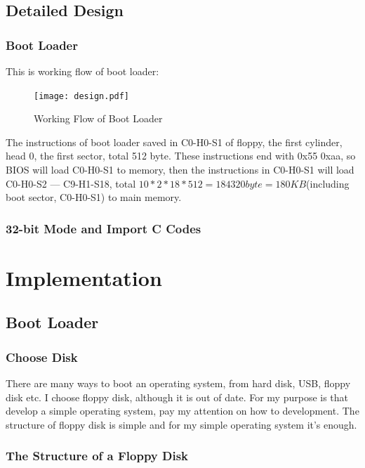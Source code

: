 \documentclass{swfcthesisp}
\begin{document}
\section{Detailed Design}
\label{sec:detailed-design}

\subsection{Boot Loader}
\label{sec:boot-loader}
This is working flow of boot loader:
\begin{figure}[!ht]
  \centering
  \texttt{[image: design.pdf]}
  \caption{Working Flow of Boot Loader}
  \label{fig:working-flow-boot-loader}
\end{figure}

The instructions of boot loader saved in C0-H0-S1 of floppy, the first cylinder, head 0,
the first sector, total 512 byte. These instructions end with 0x55 0xaa, so BIOS will load
C0-H0-S1 to memory, then the instructions in C0-H0-S1 will load C0-H0-S2 --- C9-H1-S18,
total $10*2*18*512=184320byte=180KB$(including boot sector, C0-H0-S1) to main memory.

\subsection{32-bit Mode and Import C Codes}
\label{sec:32-bit-mode}




\chapter{Implementation}

\section{Boot Loader}

\subsection{Choose Disk}
\label{sec:chose-disk}

There are many ways to boot an operating system, from hard disk, USB, floppy disk etc. I
choose floppy disk, although it is out of date. For my purpose is that develop a simple
operating system, pay my attention on how to development. The structure of floppy disk is
simple and for my simple operating system it's enough.

\subsection{The Structure of a Floppy Disk}
\label{sec:struct-floppy-disk}
\end{document}
